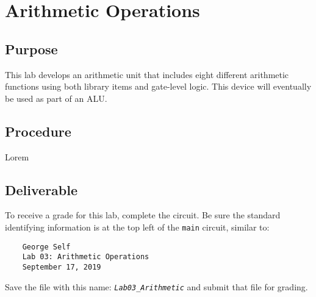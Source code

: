 \chapter{Arithmetic Operations}\label{arith}

\section{Purpose}

This lab develops an arithmetic unit that includes eight different arithmetic functions using both \LE library items and gate-level logic. This device will eventually be used as part of an \acf{ALU}.


\section{Procedure}

Lorem

\section{Deliverable}

To receive a grade for this lab, complete the circuit. Be sure the standard identifying information is at the top left of the \lstinline{main} circuit, similar to: 

\bigskip
\begin{minipage}{\linewidth}
	\begin{verbatim}
	George Self
	Lab 03: Arithmetic Operations
	September 17, 2019
	\end{verbatim}
\end{minipage}
\bigskip

Save the file with this name: \emph{\texttt{Lab03\_Arithmetic}} and submit that file for grading.

